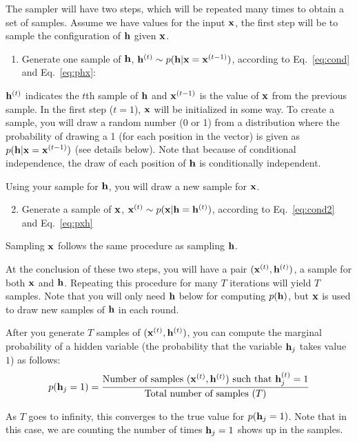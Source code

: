\documentclass[11pt]{article}
\newcommand{\vx}{{\bf x}}
\newcommand{\vh}{{\bf h}}
\begin{document}
The sampler will have two steps, which will be repeated many times to obtain a set of samples. Assume we have values for the input $\vx$,
the first step will be to sample the configuration of $\vh$ given $\vx$.
\begin{enumerate}
\item
Generate one sample of $\vh$, $\vh^{(t)} \sim p(\vh|\vx=\vx^{(t-1)})$, according to Eq.~\ref{eq:cond} and Eq.~\ref{eq:phx}:

\end{enumerate}
$\vh^{(t)}$ indicates the $t$th sample of $\vh$ and $\vx^{(t-1)}$ is the value of $\vx$ from the previous sample. In the first step ($t=1$),
$\vx$ will be initialized in some way.  To create a sample, you will draw a random number (0 or 1) from a distribution
where the probability of drawing a 1 (for each position in the vector) is given as $p(\vh|\vx=\vx^{(t-1)})$ (see details below). Note that because
of conditional independence, the draw of each position of $\vh$ is conditionally independent.

Using your sample for $\vh$, you will draw a new sample for $\vx$.
\begin{enumerate}
\setcounter{enumi}{1}
\item
Generate a sample of $\vx$, $\vx^{(t)} \sim p(\vx|\vh=\vh^{(t)})$, according to Eq.~\ref{eq:cond2} and Eq.~\ref{eq:pxh}
\end{enumerate}
Sampling $\vx$ follows the same procedure as sampling $\vh$.

At the conclusion of these two steps, you will have a pair
$(\vx^{(t)} , \vh^{(t)})$, a sample for both $\vx$ and $\vh$.  Repeating this procedure for many $T$ iterations will yield $T$ samples.
Note that you will only need $\vh$ below for computing $p(\vh)$, but $\vx$ is used to draw new samples of
$\vh$ in each round.

After you generate $T$ samples of $(\vx^{(t)} , \vh^{(t)})$, you can compute the marginal probability of a hidden variable (the probability that
the variable $\vh_j$ takes value $1$) as follows:
\begin{equation}
p(\vh_j = 1 ) = \frac{\text{Number of samples } (\vx^{(t)} , \vh^{(t)}) \text{ such that }\vh_j^{(t)} = 1}{\text{Total number of samples ($T$)}}
\end{equation}

As $T$ goes to infinity, this converges to the true value for $p(\vh_j = 1 )$. Note that in this case, we are counting the number of times $\vh_j=1$ shows up in the samples.
\end{document}
